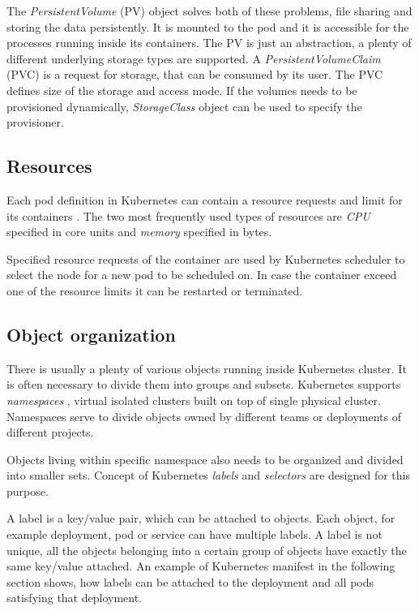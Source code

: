 \documentclass[
  digital, %
  twoside, %
  table,   %
  lof,     %
  lot,     %
]{fithesis3}
\begin{document}
The \textit{PersistentVolume} (PV) object solves both of these problems, file sharing and storing the data persistently. It is mounted to the pod and it is accessible for the processes running inside its containers. The PV is just an abstraction, a plenty of different underlying storage types are supported. A \textit{PersistentVolumeClaim} (PVC) is a request for storage, that can be consumed by its user. The PVC defines size of the storage and access mode. If the volumes needs to be provisioned dynamically, \textit{StorageClass} \cite{storage-classes} object can be used to specify the provisioner.

\subsection{Resources} \label{sec:resources}
Each pod definition in Kubernetes can contain a resource requests and limit for its containers \cite{mcrc}. The two most frequently used types of resources are \textit{CPU} specified in core units and \textit{memory} specified in bytes.

Specified resource requests of the container are used by Kubernetes scheduler to select the node for a new pod to be scheduled on. In case the container exceed one of the resource limits it can be restarted or terminated.

\subsection{Object organization} \label{sec:obj_organization}
There is usually a plenty of various objects running inside Kubernetes cluster. It is often necessary to divide them into groups and subsets. Kubernetes supports \textit{namespaces} \cite{namespaces}, virtual isolated clusters built on top of single physical cluster. Namespaces serve to divide objects owned by different teams or deployments of different projects.

Objects living within specific namespace also needs to be organized and divided into smaller sets. Concept of Kubernetes \textit{labels} and \textit{selectors} \cite{labels_selectors} are designed for this purpose.

A label is a key/value pair, which can be attached to objects. Each object, for example deployment, pod or service can have multiple labels. A label is not unique, all the objects belonging into a certain group of objects have exactly the same key/value attached. An example of Kubernetes manifest in the following section shows, how labels can be attached to the deployment and all pods satisfying that deployment.
\end{document}
